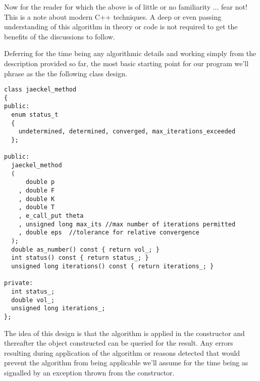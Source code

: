 \documentclass[a4paper,twoside,twocolumn]{article}
\begin{document}
Now for the reader for which the above is of little or no familiarity
... fear not! This is a note about modern C++ techniques. A deep or
even passing understanding of this algorithm in theory or code is not
required to get the benefits of the discussions to follow.

Deferring for the time being any algorithmic details and working
simply from the description provided so far, the most basic starting
point for our program we'll phrase as the the following class design.
\begin{verbatim}
class jaeckel_method
{
public:
  enum status_t
  {
    undetermined, determined, converged, max_iterations_exceeded
  };

public:
  jaeckel_method
  (
      double p
    , double F
    , double K
    , double T
    , e_call_put theta
    , unsigned long max_its //max number of iterations permitted
    , double eps  //tolerance for relative convergence
  );
  double as_number() const { return vol_; }
  int status() const { return status_; }
  unsigned long iterations() const { return iterations_; }

private:
  int status_;
  double vol_;
  unsigned long iterations_;
};
\end{verbatim}
The idea of this design is that the algorithm is applied in the
constructor and thereafter the object constructed can be queried for
the result. Any errors resulting during application of the algorithm
or reasons detected that would prevent the algorithm from being
applicable we'll assume for the time being as signalled by an
exception thrown from the constructor.
\end{document}
